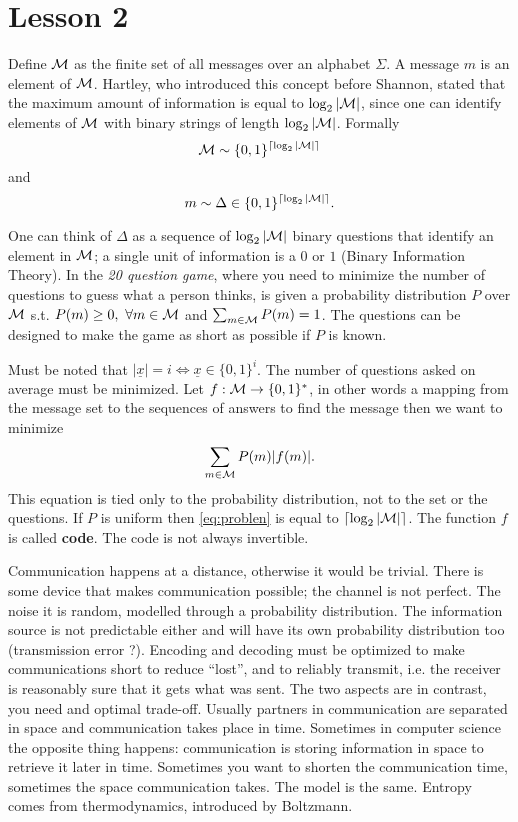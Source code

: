 
\section{Lesson 2}
Define $\mathcal{M}$ as the finite set of all messages over an alphabet $\Sigma$. A message $m$ is an element of $\mathcal{M}$. Hartley, who introduced this concept before Shannon, stated that the maximum amount of information is equal to $\log_2 |\mathcal{M}|$, since one can identify elements of $\mathcal{M}$ with binary strings of length $\log_2 |\mathcal{M}|$. Formally $$\mathcal{M} \sim \{0, 1\}^{\left\lceil\log_2 |\mathcal{M}|\right\rceil} $$ and $$ m \sim \Delta \in \{0, 1\}^{\left\lceil\log_2 |\mathcal{M}|\right\rceil}.$$

One can think of $\Delta$ as a sequence of $\log_2 |\mathcal{M}|$ binary questions that identify an element in $\mathcal{M}$; a single unit of information is a $0$ or $1$ (Binary Information Theory). In the \emph{20 question game}, where you need to minimize the number of questions to guess what a person thinks, is given a probability distribution $P$ over $\mathcal{M}$ s.t. $P(m) \geq 0,\ \forall m \in \mathcal{M}$ and $\sum_{m \in \mathcal{M}} P(m) = 1$. The questions can be designed to make the game as short as possible if $P$ is known.

Must be noted that $|\underline{x}| = i \Leftrightarrow \underline{x} \in \{0, 1\}^{i}$. The number of questions asked on average must be minimized. Let $f: \mathcal{M} \rightarrow \{0, 1\}^*$, in other words a mapping from the message set to the sequences of answers to find the message then we want to minimize 
\begin{equation} \label{eq:problen}
\sum_{m \in \mathcal{M}} P(m) |f(m)|.
\end{equation} 
This equation is tied only to the probability distribution, not to the set or the questions. If $P$ is uniform then \ref{eq:problen} is equal to $\left\lceil\log_2 |\mathcal{M}|\right\rceil$. The function $f$ is called \textbf{code}. The code is not always invertible.

Communication happens at a distance, otherwise it would be trivial. There is some device that makes communication possible; the channel is not perfect. The noise it is random, modelled through a probability distribution. The information source is not predictable either and will have its own probability distribution too (transmission error ?). Encoding and decoding must be optimized to make communications short to reduce ``lost'', and to reliably transmit, i.e. the receiver is reasonably sure that it gets what was sent. The two aspects are in contrast, you need and optimal trade-off. Usually partners in communication are separated in space and communication takes place in time. Sometimes in computer science the opposite thing happens: communication is storing information in space to retrieve it later in time. Sometimes you want to shorten the communication time, sometimes the space communication takes. The model is the same. Entropy comes from thermodynamics, introduced by Boltzmann.